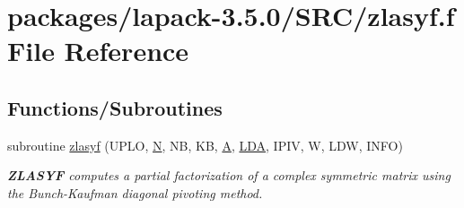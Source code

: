 \hypertarget{zlasyf_8f}{}\section{packages/lapack-\/3.5.0/\+S\+R\+C/zlasyf.f File Reference}
\label{zlasyf_8f}
\subsection*{Functions/\+Subroutines}
\begin{DoxyCompactItemize}
\item 
subroutine \hyperlink{group__complex16SYcomputational_ga4bc883ee395efa527339d112e2df7ab6}{zlasyf} (U\+P\+L\+O, \hyperlink{polmisc_8c_a0240ac851181b84ac374872dc5434ee4}{N}, N\+B, K\+B, \hyperlink{classA}{A}, \hyperlink{example__user_8c_ae946da542ce0db94dced19b2ecefd1aa}{L\+D\+A}, I\+P\+I\+V, W, L\+D\+W, I\+N\+F\+O)
\begin{DoxyCompactList}\small\item\em {\bfseries Z\+L\+A\+S\+Y\+F} computes a partial factorization of a complex symmetric matrix using the Bunch-\/\+Kaufman diagonal pivoting method. \end{DoxyCompactList}\end{DoxyCompactItemize}
